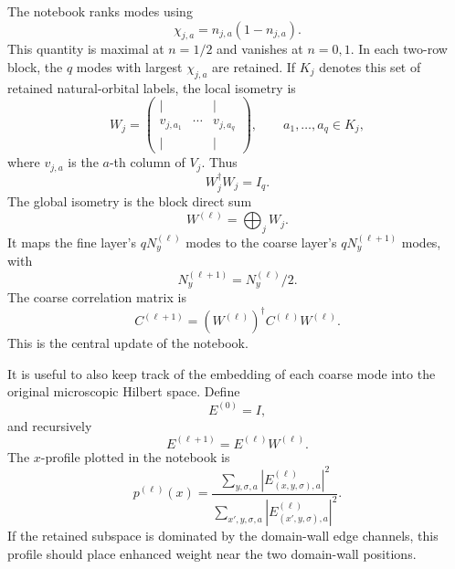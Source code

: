 \documentclass[aps,prb,twocolumn,floatfix]{revtex4-2}
\begin{document}
The notebook ranks modes using
\begin{equation}
  \chi_{j,a}=n_{j,a}(1-n_{j,a}).
  \label{eq:chi}
\end{equation}
This quantity is maximal at \(n=1/2\) and vanishes at \(n=0,1\).  In each
two-row block, the \(q\) modes with largest \(\chi_{j,a}\) are retained.  If
\(K_j\) denotes this set of retained natural-orbital labels, the local isometry
is
\begin{equation}
  W_j =
  \begin{pmatrix}
    | & & | \\
    v_{j,a_1} & \cdots & v_{j,a_q} \\
    | & & |
  \end{pmatrix},
  \qquad
  a_1,\ldots,a_q\in K_j,
  \label{eq:local-isometry}
\end{equation}
where \(v_{j,a}\) is the \(a\)-th column of \(V_j\).  Thus
\begin{equation}
  W_j^\dagger W_j=I_q.
\end{equation}
The global isometry is the block direct sum
\begin{equation}
  W^{(\ell)}=\bigoplus_j W_j.
  \label{eq:global-isometry}
\end{equation}
It maps the fine layer's \(qN_y^{(\ell)}\) modes to the coarse layer's
\(qN_y^{(\ell+1)}\) modes, with
\begin{equation}
  N_y^{(\ell+1)}=N_y^{(\ell)}/2.
\end{equation}
The coarse correlation matrix is
\begin{equation}
  C^{(\ell+1)}
  =
  \left(W^{(\ell)}\right)^\dagger
  C^{(\ell)}
  W^{(\ell)}.
  \label{eq:coarse-c}
\end{equation}
This is the central update of the notebook.

It is useful to also keep track of the embedding of each coarse mode into the
original microscopic Hilbert space.  Define
\begin{equation}
  E^{(0)}=I,
\end{equation}
and recursively
\begin{equation}
  E^{(\ell+1)}=E^{(\ell)}W^{(\ell)}.
  \label{eq:embedding}
\end{equation}
The \(x\)-profile plotted in the notebook is
\begin{equation}
  p^{(\ell)}(x)
  =
  \frac{
    \sum_{y,\sigma,a}
    \left|E^{(\ell)}_{(x,y,\sigma),a}\right|^2
  }{
    \sum_{x',y,\sigma,a}
    \left|E^{(\ell)}_{(x',y,\sigma),a}\right|^2
  }.
  \label{eq:x-profile}
\end{equation}
If the retained subspace is dominated by the domain-wall edge channels, this
profile should place enhanced weight near the two domain-wall positions.
\end{document}
